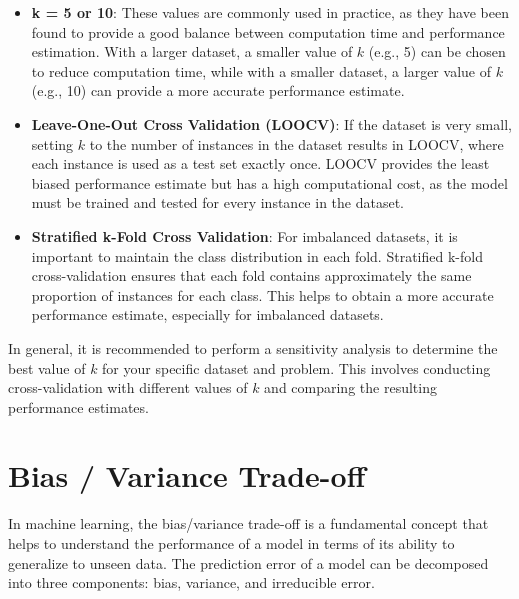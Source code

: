 \documentclass[12pt]{article}
\begin{document}
\begin{itemize}
\item \textbf{k = 5 or 10}: These values are commonly used in practice, as they have been found to provide a good balance between computation time and performance estimation. With a larger dataset, a smaller value of $k$ (e.g., 5) can be chosen to reduce computation time, while with a smaller dataset, a larger value of $k$ (e.g., 10) can provide a more accurate performance estimate.
\item \textbf{Leave-One-Out Cross Validation (LOOCV)}: If the dataset is very small, setting $k$ to the number of instances in the dataset results in LOOCV, where each instance is used as a test set exactly once. LOOCV provides the least biased performance estimate but has a high computational cost, as the model must be trained and tested for every instance in the dataset.
\item \textbf{Stratified k-Fold Cross Validation}: For imbalanced datasets, it is important to maintain the class distribution in each fold. Stratified k-fold cross-validation ensures that each fold contains approximately the same proportion of instances for each class. This helps to obtain a more accurate performance estimate, especially for imbalanced datasets.
\end{itemize}

In general, it is recommended to perform a sensitivity analysis to determine the best value of $k$ for your specific dataset and problem. This involves conducting cross-validation with different values of $k$ and comparing the resulting performance estimates.


\section{Bias / Variance Trade-off}

In machine learning, the bias/variance trade-off is a fundamental concept that helps to understand the performance of a model in terms of its ability to generalize to unseen data. The prediction error of a model can be decomposed into three components: bias, variance, and irreducible error.
\end{document}
